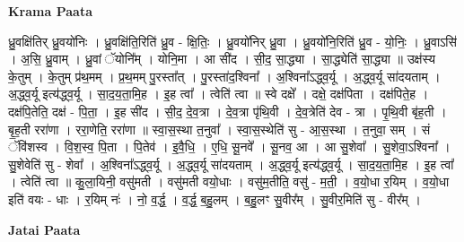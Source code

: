 \documentclass[17pt]{extarticle}
\begin{document}
\textbf{Krama Paata} \newline

ध्रु॒वक्षि॑तिर् ध्रु॒वयो॑निः । ध्रु॒वक्षि॑ति॒रिति॑ ध्रु॒व - क्षि॒तिः॒ । ध्रु॒वयो॑निर् ध्रु॒वा । ध्रु॒वयो॑नि॒रिति॑ ध्रु॒व - यो॒निः॒ । ध्रु॒वाऽसि॑ । अ॒सि॒ ध्रु॒वाम् । ध्रु॒वां ॅयोनि᳚म् । योनि॒मा । आ सी॑द । सी॒द॒ सा॒द्ध्या । सा॒द्ध्येति॑ सा॒द्ध्या ॥ उक्ष॑स्य के॒तुम् । के॒तुम् प्र॑थ॒मम् । प्र॒थ॒मम् पु॒रस्ता᳚त् । पु॒रस्ता॑द॒श्विना᳚ । अ॒श्विना᳚ऽद्ध्व॒र्यू । अ॒द्ध्व॒र्यू सा॑दयताम् । अ॒द्ध्व॒र्यू इत्य॑द्ध्व॒र्यू । सा॒द॒य॒ता॒मि॒ह । इ॒ह त्वा᳚ । त्वेति॑ त्वा ॥ स्वे दक्षे᳚ । दक्षे॒ दक्ष॑पिता । दक्ष॑पिते॒ह । दक्ष॑पि॒तेति॒ दक्ष॑ - पि॒ता॒ । इ॒ह सी॑द । सी॒द॒ दे॒व॒त्रा । दे॒व॒त्रा पृ॑थि॒वी । दे॒व॒त्रेति॑ देव - त्रा । पृ॒थि॒वी बृ॑ह॒ती । बृ॒ह॒ती ररा॑णा । ररा॒णेति॒ ररा॑णा ॥ स्वा॒स॒स्था त॒नुवा᳚ । स्वा॒स॒स्थेति॑ सु - आ॒स॒स्था । त॒नुवा॒ सम् । सं ॅवि॑शस्व । वि॒श॒स्व॒ पि॒ता । पि॒तेव॑ । इ॒वै॒धि॒ । ए॒धि॒ सू॒नवे᳚ । सू॒नव॒ आ । आ सु॒शेवा᳚ । सु॒शेवा॒ऽश्विना᳚ । सु॒शेवेति॑ सु - शेवा᳚ । अ॒श्विना᳚ऽद्ध्व॒र्यू । अ॒द्ध्व॒र्यू सा॑दयताम् । अ॒द्ध्व॒र्यू इत्य॑द्ध्व॒र्यू । सा॒द॒य॒ता॒मि॒ह । इ॒ह त्वा᳚ । त्वेति॑ त्वा ॥ कु॒ला॒यिनी॒ वसु॑मती । वसु॑मती वयो॒धाः । वसु॑म॒तीति॒ वसु॑ - म॒ती॒ । व॒यो॒धा र॒यिम् । व॒यो॒धा इति॑ वयः - धाः । र॒यिम् नः॑ । नो॒ व॒र्द्ध॒ । व॒र्द्ध॒ ब॒हु॒लम् । ब॒हु॒लꣳ सु॒वीर᳚म् । सु॒वीर॒मिति॑ सु - वीर᳚म् । \newline

\textbf{Jatai Paata} \newline
\end{document}
